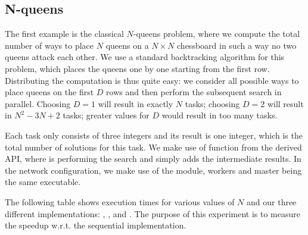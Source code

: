 \documentclass{llncs}
\begin{document}
\subsection{N-queens}\label{sec:n-queens}

The first example is the classical $N$-queens problem, where we
compute the total number of ways to place $N$ queens on a $N\times N$
chessboard in such a way no two queens attack each other.
We use a standard backtracking algorithm for this problem, which
places the queens one by one starting from the first row.
Distributing the computation is thus quite easy: we consider all
possible ways to place queens on the first $D$ rows and then perform
the subsequent search in parallel. Choosing $D=1$ will result in
exactly $N$ tasks; choosing $D=2$ will result in $N^2-3N+2$ tasks; 
greater values for $D$ would result in too many tasks.


Each task only consists of three integers and its result is one integer,
which is the total number of solutions for this task.
We make use of function  from the derived API,
where  is performing the search and  simply adds the
intermediate results.
In the network configuration, we make use of the 
module, workers and master being the same executable.

The following table shows execution times for various values of $N$
and our three different implementations: , , and
. The purpose of this experiment is to measure the speedup
w.r.t. the sequential implementation.
\end{document}
